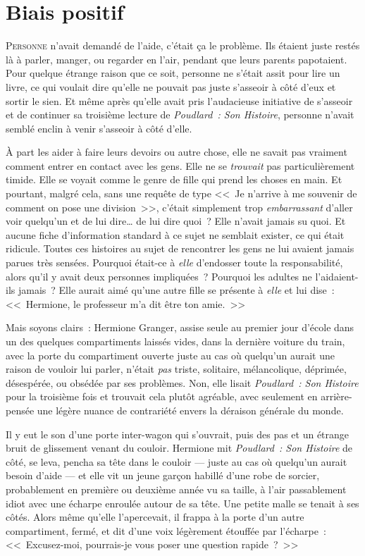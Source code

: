 \chapter{Biais positif}

\lettrine{P}{ersonne} n'avait demandé de l'aide, c'était ça le problème. Ils étaient juste restés là à parler, manger, ou regarder en l'air, pendant que leurs parents papotaient. Pour quelque étrange raison que ce soit, personne ne s'était assit pour lire un livre, ce qui voulait dire qu'elle ne pouvait pas juste s'asseoir à côté d'eux et sortir le sien. Et même après qu'elle avait pris l'audacieuse initiative de s'asseoir et de continuer sa troisième lecture de \emph{Poudlard~: Son Histoire}, personne n'avait semblé enclin à venir s'asseoir à côté d'elle.

À part les aider à faire leurs devoirs ou autre chose, elle ne savait pas vraiment comment entrer en contact avec les gens. Elle ne se \emph{trouvait} pas particulièrement timide. Elle se voyait comme le genre de fille qui prend les choses en main. Et pourtant, malgré cela, sans une requête de type <<~Je n'arrive à me souvenir de comment on pose une division~>>, c'était simplement trop \emph{embarrassant} d'aller voir quelqu'un et de lui dire… de lui dire quoi~? Elle n'avait jamais su quoi. Et aucune fiche d'information standard à ce sujet ne semblait exister, ce qui était ridicule. Toutes ces histoires au sujet de rencontrer les gens ne lui avaient jamais parues très sensées. Pourquoi était-ce à \emph{elle} d'endosser toute la responsabilité, alors qu'il y avait deux personnes impliquées~? Pourquoi les adultes ne l'aidaient-ils jamais~? Elle aurait aimé qu'une autre fille se présente à \emph{elle} et lui dise~: <<~Hermione, le professeur m'a dit être ton amie.~>>

Mais soyons clairs~: Hermione Granger, assise seule au premier jour d'école dans un des quelques compartiments laissés vides, dans la dernière voiture du train, avec la porte du compartiment ouverte juste au cas où quelqu'un aurait une raison de vouloir lui parler, n'était \emph{pas} triste, solitaire, mélancolique, déprimée, désespérée, ou obsédée par ses problèmes. Non, elle lisait \emph{Poudlard~: Son Histoire} pour la troisième fois et trouvait cela plutôt agréable, avec seulement en arrière-pensée une légère nuance de contrariété envers la déraison générale du monde.

Il y eut le son d'une porte inter-wagon qui s'ouvrait, puis des pas et un étrange bruit de glissement venant du couloir. Hermione mit \emph{Poudlard~: Son Histoire} de côté, se leva, pencha sa tête dans le couloir — juste au cas où quelqu'un aurait besoin d'aide — et elle vit un jeune garçon habillé d’une robe de sorcier, probablement en première ou deuxième année vu sa taille, à l'air passablement idiot avec une écharpe enroulée autour de sa tête. Une petite malle se tenait à ses côtés. Alors même qu'elle l'apercevait, il frappa à la porte d'un autre compartiment, fermé, et dit d'une voix légèrement étouffée par l'écharpe~: <<~Excusez-moi, pourrais-je vous poser une question rapide~?~>>

